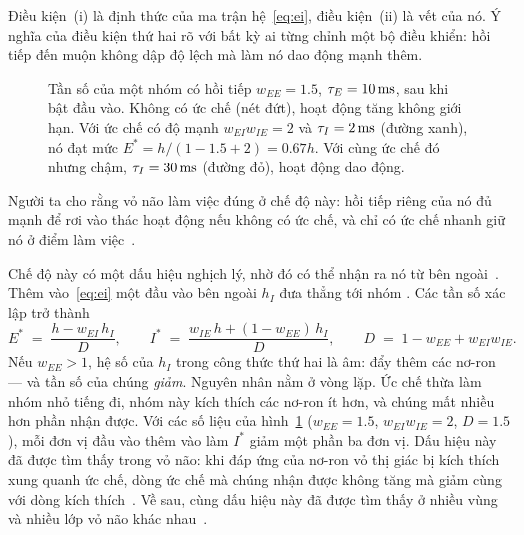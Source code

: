 Điều kiện~(i) là định thức của ma trận hệ~\eqref{eq:ei}, điều kiện~(ii) là vết của nó. Ý nghĩa của điều kiện thứ hai rõ với bất kỳ ai từng chỉnh một bộ điều khiển: hồi tiếp đến muộn không dập độ lệch mà làm nó dao động mạnh thêm.

\begin{figure}[t]
\centering
{}
\caption{Tần số của một nhóm  có hồi tiếp $w_{EE}=1.5$, $\tau_E=10\,\text{ms}$, sau khi bật đầu vào. Không có ức chế (nét đứt), hoạt động tăng không giới hạn. Với ức chế có độ mạnh $w_{EI}w_{IE}=2$ và $\tau_I=2\,\text{ms}$ (đường xanh), nó đạt mức $E^*=h/(1-1.5+2)=0.67h$. Với cùng ức chế đó nhưng chậm, $\tau_I=30\,\text{ms}$ (đường đỏ), hoạt động dao động.}
\label{fig:ei}
\end{figure}

Người ta cho rằng vỏ não làm việc đúng ở chế độ này: hồi tiếp riêng của nó đủ mạnh để rơi vào thác hoạt động nếu không có ức chế, và chỉ có ức chế nhanh giữ nó ở điểm làm việc~\cite{Tsodyks1997isn}.

Chế độ này có một dấu hiệu nghịch lý, nhờ đó có thể nhận ra nó từ bên ngoài~\cite{Tsodyks1997isn}. Thêm vào~\eqref{eq:ei} một đầu vào bên ngoài $h_I$ đưa thẳng tới nhóm . Các tần số xác lập trở thành
\begin{equation}
E^* \;=\; \frac{h-w_{EI}\,h_I}{D},\qquad
I^* \;=\; \frac{w_{IE}\,h+(1-w_{EE})\,h_I}{D},\qquad
D \;=\; 1-w_{EE}+w_{EI}w_{IE} .
\label{eq:isn}
\end{equation}
Nếu $w_{EE}>1$, hệ số của $h_I$ trong công thức thứ hai là âm: đẩy thêm các nơ-ron  --- và tần số của chúng \emph{giảm}. Nguyên nhân nằm ở vòng lặp. Ức chế thừa làm nhóm  nhỏ tiếng đi, nhóm này kích thích các nơ-ron  ít hơn, và chúng mất nhiều hơn phần nhận được. Với các số liệu của hình~\ref{fig:ei} ($w_{EE}=1.5$, $w_{EI}w_{IE}=2$, $D=1.5$), mỗi đơn vị đầu vào thêm vào làm $I^*$ giảm một phần ba đơn vị. Dấu hiệu này đã được tìm thấy trong vỏ não: khi đáp ứng của nơ-ron vỏ thị giác bị kích thích xung quanh ức chế, dòng ức chế mà chúng nhận được không tăng mà giảm cùng với dòng kích thích~\cite{Ozeki2009}. Về sau, cùng dấu hiệu này đã được tìm thấy ở nhiều vùng và nhiều lớp vỏ não khác nhau~\cite{Sanzeni2020}.


